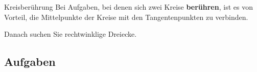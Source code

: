 \begin{rezept}{Kreisberührung}{}
  Bei Aufgaben, bei denen sich zwei Kreise \textbf{berühren}, ist es
  von Vorteil, die Mittelpunkte der Kreise mit den Tangentenpunkten zu
  verbinden.

  Danach suchen Sie rechtwinklige Dreiecke.
\end{rezept}

\subsection*{Aufgaben}

\newpage
